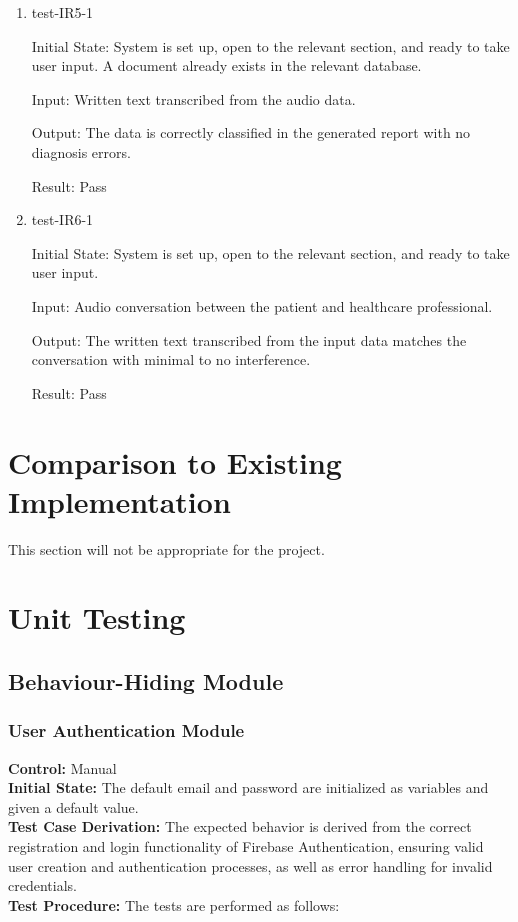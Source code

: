 \documentclass[12pt, titlepage]{article}
\begin{document}
\begin{enumerate}
  \item test-IR5-1 \label{test-IR6-1} 
  
  Initial State: System is set up, open to the relevant section, and ready to take user input. A document already exists in the relevant database.

  Input: Written text transcribed from the audio data.

  Output: The data is correctly classified in the generated report with no diagnosis errors.

  Result: Pass

  \item test-IR6-1 \label{test-IR7-1}

  Initial State: System is set up, open to the relevant section, and ready to take user input.

  Input: Audio conversation between the patient and healthcare professional.

  Output: The written text transcribed from the input data matches the conversation with minimal to no interference.

  Result: Pass

\end{enumerate}


\section{Comparison to Existing Implementation}	

This section will not be appropriate for the project.

\section{Unit Testing}

\subsection{Behaviour-Hiding Module}

\subsubsection{User Authentication Module}

  \textbf{Control:} Manual \\
  \textbf{Initial State:} The default email and password are initialized as variables and given a default value.\\
  \textbf{Test Case Derivation:} The expected behavior is derived from the correct registration and login functionality of Firebase Authentication, ensuring valid user creation and authentication processes, as well as error handling for invalid credentials.\\
  \textbf{Test Procedure:} The tests are performed as follows:\\
\end{document}
